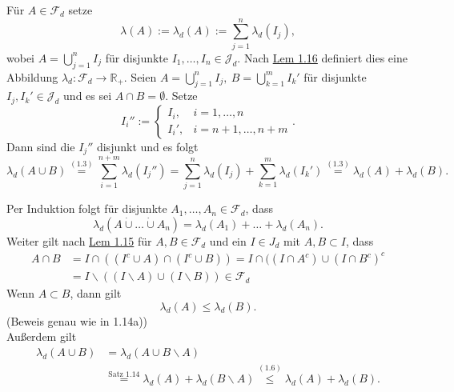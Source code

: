 \documentclass[a4paper]{scrreprt}
\newcommand{\R}{\mathbb{R}}
\newcommand{\Fd}{\mathcal{F}_d}
\newcommand{\Jd}{\mathcal{J}_d}
\newcommand{\dcup}{\dot{\cup}}
\newcommand{\jlabel}[1]{\label{j_#1}}
\newcommand{\jshortlink}[1]{\jhyperref{#1}{\text{#1}}}
\newcommand{\jhyperref}[2]{\hyperref[j_#1]{#2}}
\newcommand{\jlink}[1]{\jhyperref{#1}{#1}}
\theoremstyle{plain}
\theoremstyle{definition}
\begin{document}
{{{Für $A\in\Fd$ setze
\jlabel{(1.3)}
\begin{equation}
    \lambda(A) := \lambda_d(A) := \sum_{j=1}^n \lambda_d(I_j),
\end{equation} 
wobei $A = \bigcup_{j=1}^n I_j$ für disjunkte $I_1, \dots, I_n \in \Jd$. Nach \jlink{Lem 1.16} definiert dies eine Abbildung $\lambda_d : \Fd \rightarrow \R_+$. Seien $A=\bigcup_{j=1}^n I_j, \ B = \bigcup_{k=1}^m I_k'$ für disjunkte $I_j, I_k' \in \Jd$ und es sei $A\cap B = \emptyset$. Setze
\begin{displaymath}
    I_i'' := \begin{cases} I_i, & i=1,\dots,n\\ I_i', &i = n+1,\dots,n+m\end{cases}.
\end{displaymath}
Dann sind die $I_j''$ disjunkt und es folgt
\begin{displaymath}
    \lambda_d(A \cup B) \overset{\jlink{(1.3)}}{=} \sum_{i=1}^{n+m} \lambda_d(I_j'') = \sum_{j=1}^n \lambda_d(I_j) + \sum_{k=1}^m \lambda_d(I_k') \overset{\jlink{(1.3)}}{=} \lambda_d(A) + \lambda_d(B).
\end{displaymath}

Per Induktion folgt für disjunkte $A_1,\dots,A_n \in \Fd$, dass
\jlabel{(1.4)}
\begin{equation}
    \lambda_d(A \dcup \dots \dcup A_n) = \lambda_d(A_1) + \dots + \lambda_d(A_n).
\end{equation}
Weiter gilt nach \jlink{Lem 1.15} für $A,B\in\Fd$ und ein $I \in J_d$ mit $A,B \subset I$, dass
\jlabel{(1.5)}
\begin{equation}
    \begin{split}
        A\cap B &= I\cap((I^c\cup A)\cap (I^c\cup B)) = I\cap ((I\cap A^c)\cup(I\cap B^c)^c \\
                &= I\backslash ((I\backslash A) \cup (I\backslash B)) \in \Fd
    \end{split}
\end{equation}
Wenn $A\subset B$, dann gilt
\jlabel{(1.6)}
\begin{equation}
    \lambda_d(A) \le \lambda_d(B).
\end{equation}
(Beweis genau wie in 1.14a)) \\
Außerdem gilt
\jlabel{(1.7)}
\begin{equation}
    \begin{split}
        \lambda_d(A\cup B) &= \lambda_d(A\cup B \backslash A)\\
        &\overset{\jshortlink{Satz 1.14}}{=} \lambda_d(A) + \lambda_d(B\backslash A) \overset{\jlink{(1.6)}}{\le} \lambda_d(A) + \lambda_d(B).
    \end{split}
\end{equation}

}}}
\end{document}
